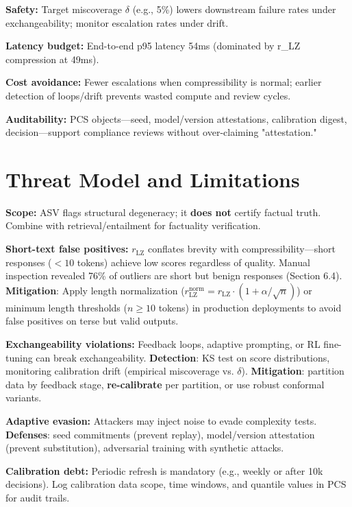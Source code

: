 \documentclass[11pt]{article}
\begin{document}
\textbf{Safety:} Target miscoverage $\delta$ (e.g., 5\%) lowers downstream failure rates under exchangeability; monitor escalation rates under drift.

\textbf{Latency budget:} End-to-end p95 latency 54ms (dominated by r_LZ compression at 49ms).

\textbf{Cost avoidance:} Fewer escalations when compressibility is normal; earlier detection of loops/drift prevents wasted compute and review cycles.

\textbf{Auditability:} PCS objects---seed, model/version attestations, calibration digest, decision---support compliance reviews without over-claiming "attestation."

\section{Threat Model and Limitations}
\label{sec:limitations}

\textbf{Scope:} ASV flags structural degeneracy; it \textbf{does not} certify factual truth. Combine with retrieval/entailment for factuality verification.

\textbf{Short-text false positives:} $r_{\text{LZ}}$ conflates brevity with compressibility---short responses ($< 10$ tokens) achieve low scores regardless of quality. Manual inspection revealed 76\% of outliers are short but benign responses (Section 6.4). \textbf{Mitigation}: Apply length normalization ($r_{\text{LZ}}^{\text{norm}} = r_{\text{LZ}} \cdot (1 + \alpha/\sqrt{n})$) or minimum length thresholds ($n \geq 10$ tokens) in production deployments to avoid false positives on terse but valid outputs.

\textbf{Exchangeability violations:} Feedback loops, adaptive prompting, or RL fine-tuning can break exchangeability. \textbf{Detection}: KS test on score distributions, monitoring calibration drift (empirical miscoverage vs. $\delta$). \textbf{Mitigation}: partition data by feedback stage, \textbf{re-calibrate} per partition, or use robust conformal variants.

\textbf{Adaptive evasion:} Attackers may inject noise to evade complexity tests. \textbf{Defenses}: seed commitments (prevent replay), model/version attestation (prevent substitution), adversarial training with synthetic attacks.

\textbf{Calibration debt:} Periodic refresh is mandatory (e.g., weekly or after 10k decisions). Log calibration data scope, time windows, and quantile values in PCS for audit trails.
\end{document}
